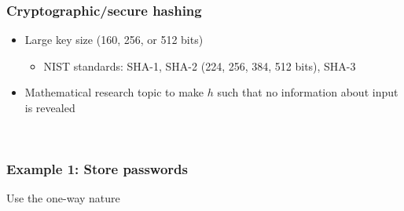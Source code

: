 \documentclass[sans,mathserif]{beamer}
\begin{document}
\begin{frame}
  \frametitle{Cryptographic/secure hashing}

  \begin{itemize}
  \item<+-> Large key size (160, 256, or 512 bits)
    \begin{itemize}
    \item NIST standards: SHA-1, SHA-2 (224, 256, 384, 512 bits), SHA-3
    \end{itemize}
  \item<+-> Mathematical research topic to make $h$ such that no
    information about input is revealed
  \end{itemize}

~



\end{frame}

\begin{frame}
  \frametitle{Example 1: Store passwords}

Use the one-way nature

\end{frame}
\end{document}
